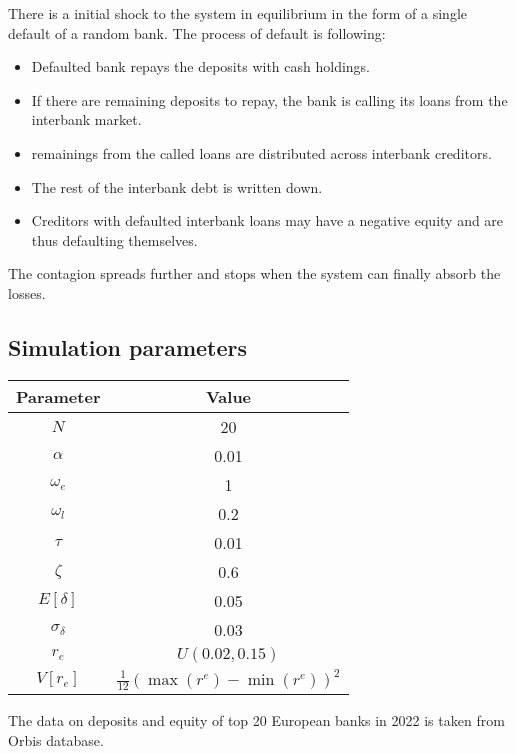 \documentclass{article}
\begin{document}
There is a initial shock to the system in equilibrium in the form of a single default of a random bank. The process of default is following:

\begin{itemize}
  \item Defaulted bank repays the deposits with cash holdings.
  \item If there are remaining deposits to repay, the bank is calling its loans from the interbank market.
  \item remainings from the called loans are distributed across interbank creditors.
  \item The rest of the interbank debt is written down.
  \item Creditors with defaulted interbank loans may have a negative equity and are thus defaulting themselves.
\end{itemize}

The contagion spreads further and stops when the system can finally absorb the losses. 

\subsection*{Simulation parameters}

\begin{center}
  \begin{tabular}{|c c|} 
   \hline
   Parameter & Value\\ [0.5ex] 
   \hline\hline
   $N$ & 20 \\ 
   \hline
   $\alpha$ & 0.01 \\
   \hline
   $\omega_e$ & 1 \\
   \hline
   $\omega_l$ & 0.2\\
   \hline
   $\tau$ & 0.01 \\ 
   \hline
   $\zeta$ & 0.6 \\ 
   \hline
   $E[\delta]$ & 0.05 \\
   \hline
   $\sigma_\delta$ & 0.03 \\ 
   \hline
   $r_e$ & $U(0.02, 0.15)$ \\ 
   \hline
   $V[r_e]$ & $\frac{1}{12}(\max(r^e) - \min(r^e))^2$ \\  [1ex] 
   \hline
  \end{tabular}
\end{center}

The data on deposits and equity of top 20 European banks in 2022 is taken from Orbis database.
\end{document}
